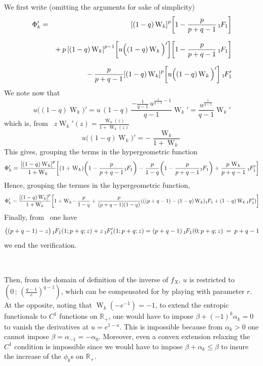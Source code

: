 \documentclass[entropy,article,submit,moreauthors,pdftex]{Definitions/mdpi}
\def\Rset{\mathbb{R}}%
\def\W{\operatorname{W}} %
\newcommand{\hypgeom}[2]{\mbox{}_{#1}\hspace{-1pt}F_{#2}}%
\begin{document}
We first write (omitting the arguments for sake of simplicity)
%
\begin{eqnarray*}
  \Phi_k' & = & \quad \left[ (1-q) \W_k \right]^p \left[ 1 - \frac{p}{p+q-1} \, \hypgeom{1}{1} \right]
  \\[2.5mm]
  && + \: p \, \left[ (1-q) \W_k \right]^{p-1} \left[u \Big( (1-q) \W_k \Big)' \right] \left[1 - \frac{p}{p+q-1} \, \hypgeom{1}{1} \right]
  \\[2.5mm]
  && - \: \frac{p}{p+q-1}  \left[ (1-q) \W_k \right]^p \left[ u \Big( (1-q) \W_k \Big)' \right] \, \hypgeom{1}{1}'
\end{eqnarray*}
%
We note now that
%
\[
u  \Big(  (1-q)   \W_k  \Big)'  =  u  \,  (1-q)   \,  \frac{-  \frac{1}{q-1}  \,
  u^{\frac{1}{q-1}-1}}{q-1} \W_k' = \frac{u^{\frac{1}{q-1}}}{q-1} \W_k'
\]
%
which is, from~\cite[Eq.~3.2]{CorGon96} $z \W_k'(z) = \frac{\W_k(z)}{1+\W_k(z)}$
%
\[
u  \Big(  (1-q)   \W_k  \Big)'  =  - \frac{\W_k}{1+\W_k}
\]
%
This gives, grouping the terms in the hypergeometric function
%
\[
\Phi_k' = \frac{\left[ (1-q) \W_k \right]^p}{1+\W_k}  \left[ (1 + \W_k) \left( 1
  - \frac{p}{p+q-1}   \hypgeom{1}{1}  \right)   -  \frac{p}{1-q}   \left(  1   -
  \frac{p}{p+q-1}   \hypgeom{1}{1}  \right)   +  \frac{p   \,  \W_k}{p+q-1}   \,
  \hypgeom{1}{1}' \right]
\]
%
Hence, grouping the termes in the hypergeometric function,
%
\[
\Phi_k'  =  \frac{\left[  (1-q)  \W_k  \right]^p}{1+\W_k}  \left[  1  +  \W_k  -
  \frac{p}{1-q} + \frac{p}{(p+q-1) (1-q)} \left( \left(  (p+q-1) - (1-q) \W_k \right) \hypgeom{1}{1}  + (1-q) \W_k \hypgeom{1}{1}' \right) \right]
\]
%
Finally, from~\cite[13.4.1]{AbrSte70} one have
%
\[
\big(  (p+q-1) - z \big) \, \hypgeom{1}{1}(1 ; p+q ; z)  + z
    \, \hypgeom{1}{1}'(1 ; p+q ; z) = (p+q-1) \, \hypgeom{1}{1}(0 ; p+q ; z) \: = \: p+q-1
\]
%
we end the verification.

\


Then, from the domain  of definition of the inverse of  $f_X$, $u$ is restricted
to $\left( 0  \, ; \, \left( \frac{q-1}{e} \right)^{q-1}  \right)$, which can be
compensated for  by playing with  parameter $r$.   At the opposite,  noting that
$\W_k\left( -e^{-1} \right)  = -1$, to extend the entropic  functionals to $C^1$
functions on $\Rset_+$, one  would have to impose $\beta +  (-1)^k \alpha_k = 0$
to vanish  the derivatives at  $u = e^{1-a}$.   This is impossible  because from
$\alpha_k > 0$ one cannot impose  $\beta = \alpha_{-1} = - \alpha_0$.  Moreover,
even a  convex extension  relaxing the  $C^1$ condition  is impossible  since we
would have to impose $\beta + \alpha_k  \le \beta$ to insure the increase of the
$\phi_k$s on $\Rset_+$.
\end{document}
